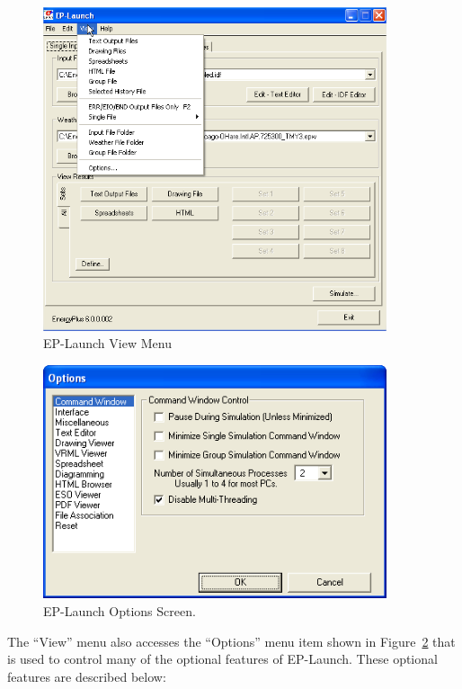 \begin{figure}[hbtp] %
\centering
\includegraphics[width=0.9\textwidth, height=0.9\textheight, keepaspectratio=true]{media/image007.png}
\caption{EP-Launch View Menu \protect \label{fig:ep-launch-view-menu}}
\end{figure}

\begin{figure}[hbtp] %
\centering
\includegraphics[width=0.9\textwidth, height=0.9\textheight, keepaspectratio=true]{media/image008.png}
\caption{EP-Launch Options Screen. \protect \label{fig:ep-launch-options-screen.}}
\end{figure}

The ``View'' menu also accesses the ``Options'' menu item shown in Figure~\ref{fig:ep-launch-options-screen.} that is used to control many of the optional features of EP-Launch. These optional features are described below:

